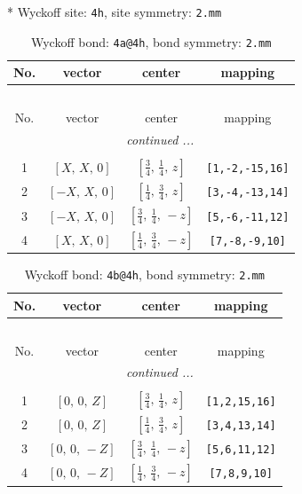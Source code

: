 \documentclass[fleqn,8pt]{jsarticle}
\begin{document}
* Wyckoff site: {\tt 4h}, site symmetry: {\tt 2.mm}
\renewcommand{\arraystretch}{1.2}
\begin{longtable}{cccc}
\caption{Wyckoff bond: {\tt 4a@4h}, bond symmetry: {\tt 2.mm}}
 \\
 \hline \hline
No. & vector & center & mapping \\ \hline \endfirsthead

\multicolumn{3}{l}{\tablename\ \thetable{}} \\
 \hline \hline
No. & vector & center & mapping \\ \hline \endhead

 \hline \hline
\multicolumn{3}{r}{\footnotesize\it continued ...} \\ \endfoot

 \hline \hline
\multicolumn{3}{r}{} \\ \endlastfoot

1 & $\left[ X,\, X,\, 0 \right]$ & $\left[ \frac{3}{4},\, \frac{1}{4},\, z \right]$ & {\tt [1,-2,-15,16]} \\ \hline
2 & $\left[ - X,\, X,\, 0 \right]$ & $\left[ \frac{1}{4},\, \frac{3}{4},\, z \right]$ & {\tt [3,-4,-13,14]} \\ \hline
3 & $\left[ - X,\, X,\, 0 \right]$ & $\left[ \frac{3}{4},\, \frac{1}{4},\, - z \right]$ & {\tt [5,-6,-11,12]} \\ \hline
4 & $\left[ X,\, X,\, 0 \right]$ & $\left[ \frac{1}{4},\, \frac{3}{4},\, - z \right]$ & {\tt [7,-8,-9,10]} \\
\end{longtable}
\renewcommand{\arraystretch}{1.2}
\begin{longtable}{cccc}
\caption{Wyckoff bond: {\tt 4b@4h}, bond symmetry: {\tt 2.mm}}
 \\
 \hline \hline
No. & vector & center & mapping \\ \hline \endfirsthead

\multicolumn{3}{l}{\tablename\ \thetable{}} \\
 \hline \hline
No. & vector & center & mapping \\ \hline \endhead

 \hline \hline
\multicolumn{3}{r}{\footnotesize\it continued ...} \\ \endfoot

 \hline \hline
\multicolumn{3}{r}{} \\ \endlastfoot

1 & $\left[ 0,\, 0,\, Z \right]$ & $\left[ \frac{3}{4},\, \frac{1}{4},\, z \right]$ & {\tt [1,2,15,16]} \\ \hline
2 & $\left[ 0,\, 0,\, Z \right]$ & $\left[ \frac{1}{4},\, \frac{3}{4},\, z \right]$ & {\tt [3,4,13,14]} \\ \hline
3 & $\left[ 0,\, 0,\, - Z \right]$ & $\left[ \frac{3}{4},\, \frac{1}{4},\, - z \right]$ & {\tt [5,6,11,12]} \\ \hline
4 & $\left[ 0,\, 0,\, - Z \right]$ & $\left[ \frac{1}{4},\, \frac{3}{4},\, - z \right]$ & {\tt [7,8,9,10]} \\
\end{longtable}
\end{document}
